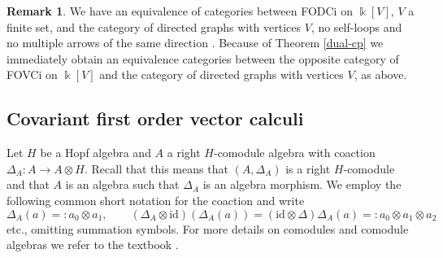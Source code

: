\documentclass{article}
\theoremstyle{definition}
\newtheorem{remark}[thm]{Remark}
\begin{document}
	\begin{remark}
		{We have an equivalence of categories between FODCi on $\Bbbk[V]$, $V$ a finite set,
			and the category of directed graphs with vertices $V$, no self-loops and no multiple arrows of the same direction \cite[Chapter 1.4]{bm}. Because of Theorem \ref{dual-cp} 
			we immediately obtain an equivalence categories between the opposite category of FOVCi on $\Bbbk[V]$
			and the category of directed graphs with vertices $V$, as above.}
	\end{remark}
	
	
	\subsection{Covariant first order vector calculi}\label{sec:covFOVC}
	
	Let $H$ be a Hopf algebra and $A$ a right $H$-comodule algebra with coaction $\Delta_A\colon A\to A\otimes H$. Recall that this means that $(A,\Delta_A)$ is a right $H$-comodule and that $A$ is an algebra such that $\Delta_A$ is an algebra morphism. We employ the following common short notation for the coaction and write
	$$
	\Delta_A(a)=:a_0\otimes a_1,\qquad(\Delta_A\otimes\mathrm{id})(\Delta_A(a))=(\mathrm{id}\otimes\Delta)\Delta_A(a)=:a_0\otimes a_1\otimes a_2
	$$
	etc., omitting summation symbols. For more details on comodules and comodule algebras we refer to the textbook \cite{mont}.
	
\end{document}
